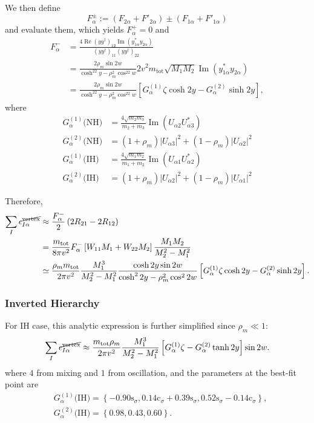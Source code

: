 \documentclass[a4paper,11pt,captions=tableheading,DIV=12]{scrartcl}
\numberwithin{equation}{section}
\newcommand\co[1]{\mathrm{c}_{#1}}
\newcommand\si[1]{\mathrm{s}_{#1}}
\renewcommand{\Re}{\mathop{\mathrm{Re}}}
\renewcommand{\Im}{\mathop{\mathrm{Im}}}
\newcommand\mtot{m_{\mathrm{tot}}}
\newcommand\yydag{(yy^\dagger)}
\begin{document}
We then define
\begin{equation}
 F^{\pm}_\alpha := (F_{2\alpha}+F'_{2\alpha})\pm(F_{1\alpha}+F'_{1\alpha})
\end{equation}
and evaluate them, which yields $F^+_\alpha=0$ and
\begin{align}
 F^-_\alpha
&=
\frac{4\Re\yydag_{12}\Im(y_{1\alpha}^*y_{2\alpha})}{\yydag_{11}\yydag_{22}}
\\&=
\frac{2\rho_m\sin2w}{\cosh^22y-\rho_m^2\cos^22w}{2v^2}{\mtot\sqrt{M_1 M_2}}
\Im(y_{1\alpha}^*y_{2\alpha})
\\
&=\frac{2\rho_m\sin2w}{\cosh^22y-\rho_m^2\cos^22w}
\left[
G^{(1)}_\alpha \zeta\cosh2y - G^{(2)}_\alpha\sinh2y
\right],
\end{align}
where
\begin{align}
  G^{(1)}_\alpha\text{(NH)}
&= \frac{4\sqrt{m_2m_3}}{m_2+m_3}\Im\left(U_{\alpha2}U_{\alpha3}^*\right)\\
  G^{(2)}_\alpha\text{(NH)}
&= (1+\rho_m)|U_{\alpha3}|^2+(1-\rho_m)|U_{\alpha2}|^2\\
  G^{(1)}_\alpha\text{(IH)}
&= \frac{4\sqrt{m_1m_2}}{m_1+m_2}\Im\left(U_{\alpha1}U_{\alpha2}^*\right)\\
  G^{(2)}_\alpha\text{(IH)}
&= (1+\rho_m)|U_{\alpha2}|^2+(1-\rho_m)|U_{\alpha1}|^2
\end{align}

Therefore,
\begin{align}
 \sum_I\epsilon^{\cancel{\text{vertex}}}_{I\alpha}
&\approx
\frac{F^-_\alpha}{2}\left(2R_{21}-2R_{12}\right)
\\
&=
\frac{\mtot}{8\pi v^2}F^-_\alpha\left[W_{11}M_1+W_{22}M_2\right]\frac{M_1M_2}{M_2^2-M_1^2}
\\&\simeq
\frac{\rho_m\mtot}{2\pi v^2}\frac{M_1^3}{M_2^2-M_1^2}
\frac{\cosh2y\sin2w}{\cosh^22y-\rho_m^2\cos^22w}
\left[
G^{(1)}_\alpha \zeta\cosh2y - G^{(2)}_\alpha\sinh2y
\right].
\end{align}
\subsubsection{Inverted Hierarchy}
For IH case, this analytic expression is further simplified since $\rho_m\ll 1$:
\begin{equation}
 \sum_I\epsilon^{\cancel{\text{vertex}}}_{I\alpha}
 \approx
\frac{\mtot\rho_m}{2\pi v^2}\frac{M_1^3}{M_2^2-M_1^2}
\left[G^{(1)}_\alpha \zeta - G^{(2)}_\alpha\tanh2y\right]\sin2w.
\end{equation}
where $4$ from mixing and $1$ from oscillation, and the parameters at the best-fit point are
\begin{align}
 &G^{(1)}_\alpha\text{(IH)}=\left\{
 -0.90\si\sigma, 0.14\co\sigma+0.39\si\sigma, 0.52\si\sigma-0.14\co\sigma
\right\},\\
 &G^{(2)}_\alpha\text{(IH)}=\left\{
   0.98, 0.43, 0.60
\right\}.
\end{align}
\end{document}

